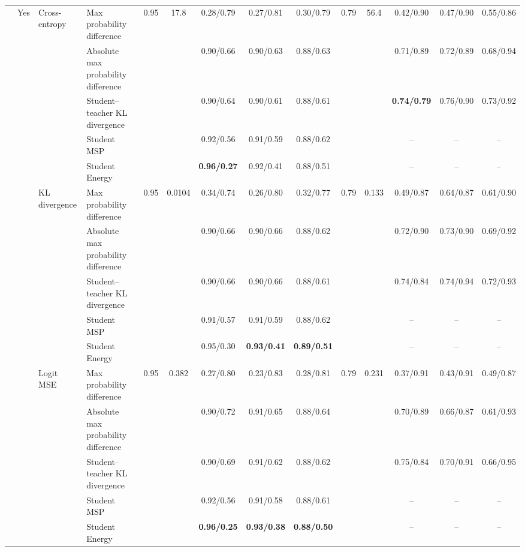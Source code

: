 \documentclass[border=2pt]{standalone}
\begin{document}
\begin{tabular}{llllcccccccccc}
 & Yes & Cross-entropy & Max probability difference & 0.95 & 17.8 & 0.28/0.79 & 0.27/0.81 & 0.30/0.79 & 0.79 & 56.4 & 0.42/0.90 & 0.47/0.90 & 0.55/0.86 \\
 &  &  & Absolute max probability difference &  &  & 0.90/0.66 & 0.90/0.63 & 0.88/0.63 &  &  & 0.71/0.89 & 0.72/0.89 & 0.68/0.94 \\
 &  &  & Student--teacher KL divergence &  &  & 0.90/0.64 & 0.90/0.61 & 0.88/0.61 &  &  & \textbf{0.74/0.79} & 0.76/0.90 & 0.73/0.92 \\
 &  &  & Student MSP &  &  & 0.92/0.56 & 0.91/0.59 & 0.88/0.62 &  &  & -- & -- & -- \\
 &  &  & Student Energy &  &  & \textbf{0.96/0.27} & 0.92/0.41 & 0.88/0.51 &  &  & -- & -- & -- \\
 &  & KL divergence & Max probability difference & 0.95 & 0.0104 & 0.34/0.74 & 0.26/0.80 & 0.32/0.77 & 0.79 & 0.133 & 0.49/0.87 & 0.64/0.87 & 0.61/0.90 \\
 &  &  & Absolute max probability difference &  &  & 0.90/0.66 & 0.90/0.66 & 0.88/0.62 &  &  & 0.72/0.90 & 0.73/0.90 & 0.69/0.92 \\
 &  &  & Student--teacher KL divergence &  &  & 0.90/0.66 & 0.90/0.66 & 0.88/0.61 &  &  & 0.74/0.84 & 0.74/0.94 & 0.72/0.93 \\
 &  &  & Student MSP &  &  & 0.91/0.57 & 0.91/0.59 & 0.88/0.62 &  &  & -- & -- & -- \\
 &  &  & Student Energy &  &  & 0.95/0.30 & \textbf{0.93/0.41} & \textbf{0.89/0.51} &  &  & -- & -- & -- \\
 &  & Logit MSE & Max probability difference & 0.95 & 0.382 & 0.27/0.80 & 0.23/0.83 & 0.28/0.81 & 0.79 & 0.231 & 0.37/0.91 & 0.43/0.91 & 0.49/0.87 \\
 &  &  & Absolute max probability difference &  &  & 0.90/0.72 & 0.91/0.65 & 0.88/0.64 &  &  & 0.70/0.89 & 0.66/0.87 & 0.61/0.93 \\
 &  &  & Student--teacher KL divergence &  &  & 0.90/0.69 & 0.91/0.62 & 0.88/0.62 &  &  & 0.75/0.84 & 0.70/0.91 & 0.66/0.95 \\
 &  &  & Student MSP &  &  & 0.92/0.56 & 0.91/0.58 & 0.88/0.61 &  &  & -- & -- & -- \\
 &  &  & Student Energy &  &  & \textbf{0.96/0.25} & \textbf{0.93/0.38} & \textbf{0.88/0.50} &  &  & -- & -- & -- \\
\bottomrule
\end{tabular}
\end{document}
